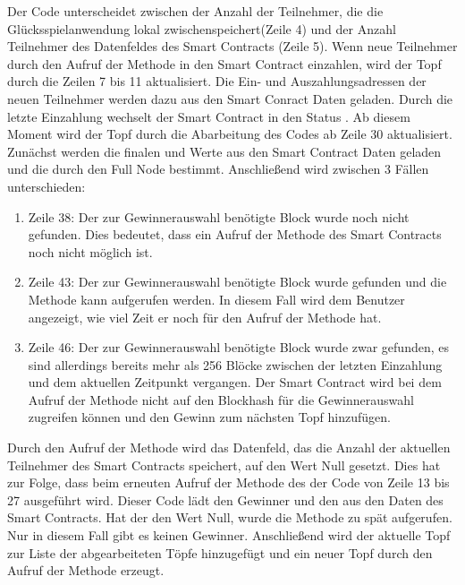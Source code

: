 Der Code unterscheidet zwischen der Anzahl der Teilnehmer, die die Glücksspielanwendung lokal zwischenspeichert(Zeile 4) und der Anzahl Teilnehmer des Datenfeldes des Smart Contracts (Zeile 5). Wenn neue Teilnehmer durch den Aufruf der  Methode in den Smart Contract einzahlen, wird der Topf durch die Zeilen 7 bis 11 aktualisiert. Die Ein- und Auszahlungsadressen der neuen Teilnehmer werden dazu aus den Smart Conract Daten geladen.
Durch die letzte Einzahlung wechselt der Smart Contract in den Status . Ab diesem Moment wird der Topf durch die Abarbeitung des Codes ab Zeile 30 aktualisiert. Zunächst werden die finalen  und  Werte aus den Smart Contract Daten geladen und die  durch den Full Node bestimmt. Anschließend wird zwischen 3 Fällen unterschieden:
\begin{enumerate}
\item Zeile 38: Der zur Gewinnerauswahl benötigte Block wurde noch nicht gefunden. Dies bedeutet, dass ein Aufruf der  Methode des Smart Contracts noch nicht möglich ist.
\item Zeile 43: Der zur Gewinnerauswahl benötigte Block wurde gefunden und die  Methode kann aufgerufen werden. In diesem Fall wird dem Benutzer angezeigt, wie viel Zeit er noch für den Aufruf der  Methode hat. 
\item Zeile 46: Der zur Gewinnerauswahl benötigte Block wurde zwar gefunden, es sind allerdings bereits mehr als 256 Blöcke zwischen der letzten Einzahlung und dem aktuellen Zeitpunkt vergangen. Der Smart Contract wird bei dem Aufruf der  Methode nicht auf den Blockhash für die Gewinnerauswahl zugreifen können und den Gewinn zum nächsten Topf hinzufügen.
\end{enumerate}
Durch den Aufruf der  Methode wird das Datenfeld, das die Anzahl der aktuellen Teilnehmer des Smart Contracts speichert, auf den Wert Null gesetzt. Dies hat zur Folge, dass beim erneuten Aufruf der  Methode des  der Code von Zeile 13 bis 27 ausgeführt wird. Dieser Code lädt den Gewinner und den  aus den Daten des Smart Contracts. Hat der  den Wert Null, wurde die  Methode zu spät aufgerufen. Nur in diesem Fall gibt es keinen Gewinner. Anschließend wird der aktuelle Topf zur Liste der abgearbeiteten Töpfe hinzugefügt und ein neuer Topf durch den Aufruf der  Methode erzeugt.

